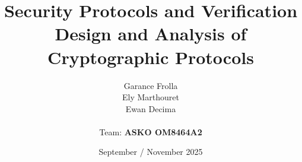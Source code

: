\documentclass[11pt]{article}
\begin{document}
    \title{
            { \textbf{Security Protocols and Verification}} \\[1ex]
        {\small Design and Analysis of Cryptographic Protocols}
    }


    \author{
        Garance Frolla \\
        Ely Marthouret \\
        Ewan Decima\\ \\
        Team: \textbf{ASKO OM8464A2}
    }

    \date{September / November 2025}


    \maketitle
    \tableofcontents
    \newpage


    
    
    
    
    
    
\end{document}
